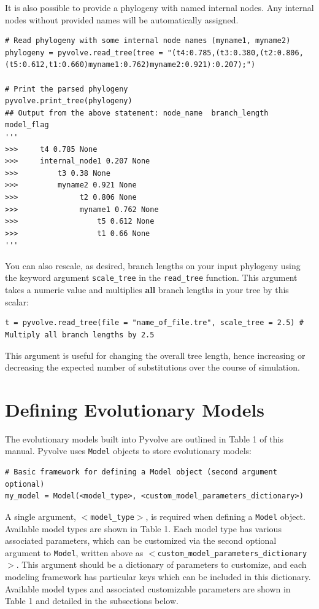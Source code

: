 \documentclass{article}
\newcommand{\code}[1]{\texttt{\small{#1}}}
\begin{document}
It is also possible to provide a phylogeny with named internal nodes. Any internal nodes without provided names will be automatically assigned.
\begin{lstlisting}
# Read phylogeny with some internal node names (myname1, myname2)
phylogeny = pyvolve.read_tree(tree = "(t4:0.785,(t3:0.380,(t2:0.806,(t5:0.612,t1:0.660)myname1:0.762)myname2:0.921):0.207);")

# Print the parsed phylogeny
pyvolve.print_tree(phylogeny)
## Output from the above statement: node_name  branch_length  model_flag
'''
>>>     t4 0.785 None
>>>     internal_node1 0.207 None
>>>         t3 0.38 None
>>>         myname2 0.921 None
>>>              t2 0.806 None
>>>              myname1 0.762 None
>>>                  t5 0.612 None
>>>                  t1 0.66 None
'''
\end{lstlisting}

You can also rescale, as desired, branch lengths on your input phylogeny using the keyword argument \code{scale\_tree} in the \code{read\_tree} function. This argument takes a numeric value and multiplies \textbf{all} branch lengths in your tree by this scalar:
\begin{lstlisting}[label={lst:scaletree}]
	t = pyvolve.read_tree(file = "name_of_file.tre", scale_tree = 2.5) # Multiply all branch lengths by 2.5
\end{lstlisting}

This argument is useful for changing the overall tree length, hence increasing or decreasing the expected number of substitutions over the course of simulation.


\section{Defining Evolutionary Models}\label{sec:evomodels}

The evolutionary models built into Pyvolve are outlined in Table 1 of this manual. Pyvolve uses \code{Model} objects to store evolutionary models:
\begin{lstlisting}
# Basic framework for defining a Model object (second argument optional)
my_model = Model(<model_type>, <custom_model_parameters_dictionary>)
\end{lstlisting}
A single argument, \code{$<$model\_type$>$}, is required when defining a \code{Model} object. Available model types are shown in Table 1. Each model type has various associated parameters, which can be customized via the second optional argument to \code{Model}, written above as \code{$<$custom\_model\_parameters\_dictionary$>$}. This argument should be a dictionary of parameters to customize, and each modeling framework has particular keys which can be included in this dictionary. Available model types and associated customizable parameters are shown in Table 1 and detailed in the subsections below.
\end{document}
